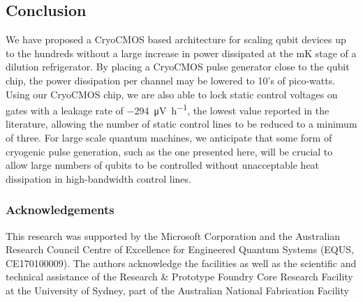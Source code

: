 \subsection{Conclusion}
We have proposed a CryoCMOS based architecture for scaling qubit devices up to the hundreds without a large increase in power dissipated at the mK stage of a dilution refrigerator. By placing a CryoCMOS pulse generator close to the qubit chip, the power dissipation per channel may be lowered to 10's of pico-watts. Using our CryoCMOS chip, we are also able to lock static control voltages on gates with a leakage rate of \SI{-294}{\micro\volt\per\hour}, the lowest value reported in the literature, allowing the number of static control lines to be reduced to a minimum of three. For large scale quantum machines, we anticipate that some form of cryogenic pulse generation, such as the one presented here, will be crucial to allow large numbers of qubits to be controlled without unacceptable heat dissipation in high-bandwidth control lines.

\subsubsection{Acknowledgements}
This research was supported by the Microsoft Corporation and the Australian Research Council Centre of Excellence for Engineered Quantum Systems (EQUS, CE170100009). The authors acknowledge the facilities as well as the scientific and technical assistance of the Research \& Prototype Foundry Core Research Facility at the University of Sydney, part of the Australian National Fabrication Facility
